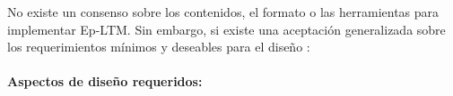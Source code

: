 No existe un consenso sobre los contenidos, el formato o las herramientas para implementar Ep-LTM.
Sin embargo, si existe una aceptación generalizada sobre los requerimientos mínimos y deseables para el diseño \cite{Vijayakumar2014, Ho2009,  Stachowicz2012, Jockel2008}:


\paragraph{Aspectos de diseño requeridos:}



